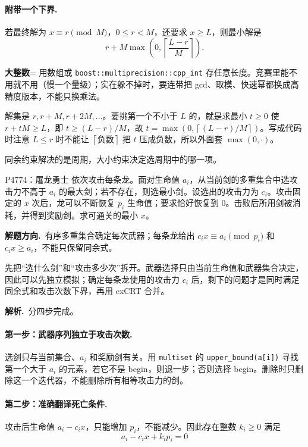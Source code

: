 \documentclass[UTF8,a4paper,11pt,twoside,openright,fontset=fandol]{ctexbook}
\theoremstyle{definition}
\newcommand{\ceil}[1]{\left\lceil #1\right\rceil}
\newcommand{\sol}{\par\noindent\textbf{解析.}\ }
\newcommand{\hint}{\par\noindent\textbf{解题方向.}\ }
\begin{document}
\paragraph{附带一个下界.} 若最终解为 $x\equiv r\pmod M$，$0\le r<M$，还要求 $x\ge L$，则最小解是
\[
 r+M\max\!\left(0,\ceil{\frac{L-r}{M}}\right).
\]

\begin{tip}
\textbf{大整数}= 用数组或 \texttt{boost::multiprecision::cpp\_int} 存任意长度。竞赛里能不用就不用（慢一个量级）；实在躲不掉时，要连带把 gcd、取模、快速幂都换成高精度版本，不能只换乘法。
\end{tip}

\begin{tip}[下界公式是怎么推出来的]
解集是 $r,r+M,r+2M,\ldots$。要挑第一个不小于 $L$ 的，就是求最小 $t\ge0$ 使 $r+tM\ge L$，即 $t\ge(L-r)/M$，故 $t=\max(0,\ceil{(L-r)/M})$。写成代码时注意 $L\le r$ 时不能让 $\ceil{\text{负数}}$ 把 $t$ 压成负数，所以外面套 $\max(0,\cdot)$。
\end{tip}

同余约束解决的是周期，大小约束决定选周期中的哪一项。


\begin{problem}{P4774：屠龙勇士}
依次攻击每条龙。面对生命值 $a_i$，从当前剑的多重集合中选攻击力不高于 $a_i$ 的最大剑；若不存在，则选最小剑。设选出的攻击力为 $c_i$。攻击固定的 $x$ 次后，龙可以不断恢复 $p_i$ 生命值；要求恰好恢复到 $0$。击败后所用剑被消耗，并得到奖励剑。求可通关的最小 $x$。
\end{problem}
\hint 有序多重集合确定每次武器；每条龙给出 $c_ix\equiv a_i\pmod{p_i}$ 和 $c_ix\ge a_i$，不能只保留同余式。

\begin{pitfall}[讲解：先看这题到底在做什么]
先把“选什么剑”和“攻击多少次”拆开。武器选择只由当前生命值和武器集合决定，因此可以先独立模拟；确定每条龙使用的攻击力 $c_i$ 后，剩下的问题才是同时满足同余式和攻击次数下界，再用 exCRT 合并。
\end{pitfall}

\sol 分四步完成。
\paragraph{第一步：武器序列独立于攻击次数.}
选剑只与当前集合、$a_i$ 和奖励剑有关。用 \texttt{multiset} 的 \texttt{upper\_bound(a[i])} 寻找第一个大于 $a_i$ 的元素，若它不是 begin，则退一步；否则选择 begin。删除时只删除这一个迭代器，不能删除所有相等攻击力的剑。

\paragraph{第二步：准确翻译死亡条件.}
攻击后生命值 $a_i-c_ix$，只能增加 $p_i$，不能减少。因此存在整数 $k_i\ge0$ 满足
\[
 a_i-c_ix+k_ip_i=0
\]
\end{document}
